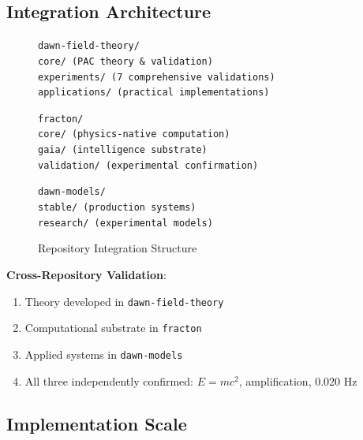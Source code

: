 \documentclass[11pt,a4paper]{article}
\begin{document}
\subsection{Integration Architecture}

\begin{figure}[h]
\centering
\small
\texttt{dawn-field-theory/}\\
\hspace{1em}\texttt{core/ (PAC theory \& validation)}\\
\hspace{1em}\texttt{experiments/ (7 comprehensive validations)}\\
\hspace{1em}\texttt{applications/ (practical implementations)}\\
\vspace{0.5em}

\texttt{fracton/}\\
\hspace{1em}\texttt{core/ (physics-native computation)}\\
\hspace{1em}\texttt{gaia/ (intelligence substrate)}\\
\hspace{1em}\texttt{validation/ (experimental confirmation)}\\
\vspace{0.5em}

\texttt{dawn-models/}\\
\hspace{1em}\texttt{stable/ (production systems)}\\
\hspace{1em}\texttt{research/ (experimental models)}
\caption{Repository Integration Structure}
\end{figure}

\textbf{Cross-Repository Validation}:
\begin{enumerate}
    \item Theory developed in \texttt{dawn-field-theory}
    \item Computational substrate in \texttt{fracton}
    \item Applied systems in \texttt{dawn-models}
    \item All three independently confirmed: $E=mc^2$, amplification, 0.020 Hz
\end{enumerate}

\subsection{Implementation Scale}
\end{document}
